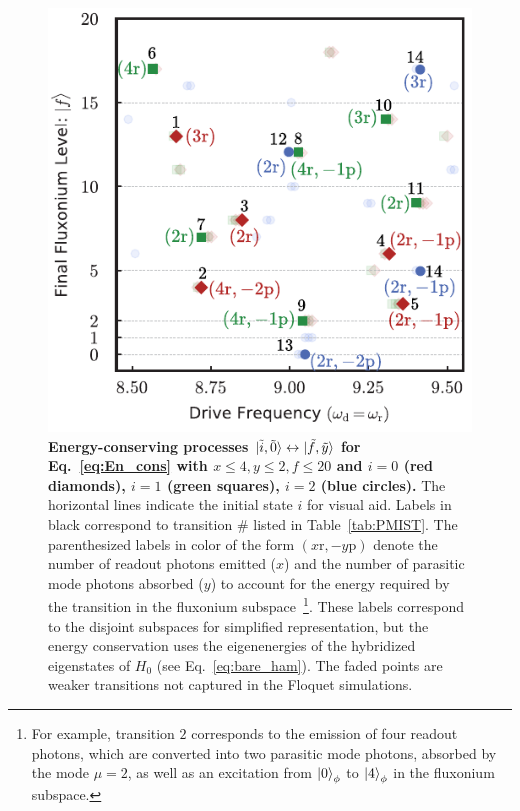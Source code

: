 \documentclass[%
reprint,
superscriptaddress,
 amsmath,amssymb,
 aps,
 prx,
longbibliography,
floatfix,
]{revtex4-2}
\begin{document}
\begin{figure}[t]
    \centering
    \includegraphics[width=\linewidth]{Figures/Trans_.pdf}
    \caption{{\bf Energy-conserving processes $\ket{\tilde{i},\tilde{0}}\leftrightarrow\ket{\tilde{f},\tilde{y}}$ for Eq.~\ref{eq:En_cons} with $x\le 4, y\le 2, f\le 20$ and $i=0$ (red diamonds), $i=1$ (green squares), $i=2$ (blue circles).} The horizontal lines indicate the initial state $i$ for visual aid. Labels in black correspond to transition $\#$ listed in Table~\ref{tab:PMIST}. The parenthesized labels in color of the form $(x \mathrm{r},- y\mathrm{p})$ denote the number of readout photons emitted ($x$) and the number of parasitic mode photons absorbed ($y$) to account for the energy required by the transition in the fluxonium subspace~\footnote{For example, transition $2$ corresponds to the emission of four readout photons, which are converted into two parasitic mode photons, absorbed by the mode $\mu=2$, as well as an excitation from $\ket{0}_\phi$ to $\ket{4}_\phi$ in the fluxonium subspace.}. These labels correspond to the disjoint subspaces for simplified representation, but the energy conservation uses the eigenenergies of the hybridized eigenstates of $H_{0}$ (see Eq.~\ref{eq:bare_ham}).    The faded points are weaker transitions not captured in the Floquet simulations.
}
    \label{fig:trans_prof}
\end{figure}
\end{document}
